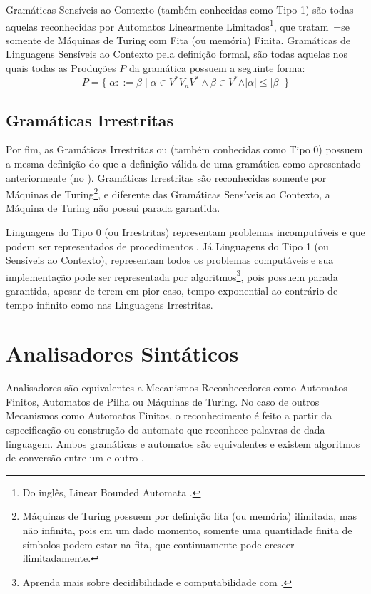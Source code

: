 Gramáticas Sensíveis ao Contexto (também conhecidas como Tipo 1) são todas aquelas reconhecidas por Automatos Linearmente Limitados\footnote{
Do inglês,
Linear Bounded Automata \cite{fundamentalsOfTheoreticalComputerScience}.
},
que tratam~=se somente de Máquinas de Turing \cite{sipserBook} com Fita (ou memória) Finita.
Gramáticas de Linguagens Sensíveis ao Contexto pela definição formal,
são todas aquelas nos quais todas as Produções $P$ da gramática possuem a seguinte forma:
$$ P = \{\; \alpha ::= \beta \;|\; \alpha \in V^* V_n V^* \land \beta \in V^*
            \land \vert\alpha\vert \leq \vert\beta\vert \;\} $$


\subsection{Gramáticas Irrestritas}

Por fim,
as Gramáticas Irrestritas ou (também conhecidas como Tipo 0) possuem a mesma definição do
que a definição válida de uma gramática como apresentado anteriormente (no
).
Gramáticas Irrestritas são reconhecidas somente por Máquinas de Turing\footnote{
Máquinas de Turing possuem por definição fita (ou memória) ilimitada,
mas não infinita,
pois em um dado momento,
somente uma quantidade finita de símbolos podem estar na fita,
que continuamente pode crescer ilimitadamente.
},
e diferente das Gramáticas Sensíveis ao Contexto,
a Máquina de Turing não possui parada garantida.

Linguagens do Tipo 0 (ou Irrestritas) representam problemas incomputáveis e
que podem ser representados de procedimentos \cite{sipserBook}.
Já Linguagens do Tipo 1 (ou Sensíveis ao Contexto),
representam todos os problemas computáveis e
sua implementação pode ser representada por algoritmos\footnote{
Aprenda mais sobre decidibilidade e
computabilidade com .
},
pois possuem parada garantida,
apesar de terem em pior caso,
tempo exponential ao contrário de tempo infinito como nas Linguagens Irrestritas.


\section{Analisadores Sintáticos}
\label{analisadoresSintaticos}

Analisadores são equivalentes a Mecanismos Reconhecedores como Automatos Finitos,
Automatos de Pilha ou
Máquinas de Turing.
No caso de outros Mecanismos como Automatos Finitos,
o reconhecimento é feito a partir da especificação ou
construção do automato que reconhece palavras de dada linguagem.
Ambos gramáticas e
automatos são equivalentes e
existem algoritmos de conversão entre um e
outro \cite{hopcroftBook}.

